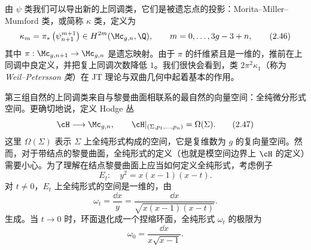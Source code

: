 

由 $\psi$ 类我们可以导出新的上同调类，它们是被遗忘点的投影：Morita–Miller–Mumford 类，或简称 $\kappa$ 类，定义为
\begin{equation}
  \kappa_m=\pi_*\left(\psi_{n+1}^{m+1}\right)\in H^{2m}(\Mc_{g,n},\Q),\qquad m=0,\dots,3g-3+n,
  \tag{2.46}
\end{equation}
其中 $\pi:\Mc_{g,n+1}\to\Mc_{g,n}$ 是遗忘映射。由于 $\pi$ 的纤维紧且是一维的，推前在上同调中良定义，并把复上同调次数降低 $1$。我们很快会看到，类 $2\pi^2\kappa_1$（称为\emph{Weil–Petersson 类}）在 JT 理论与双曲几何中起着基本的作用。

第三组自然的上同调类来自与黎曼曲面相联系的最自然的向量空间：全纯微分形式空间。更确切地说，定义 Hodge 丛
\begin{equation}
  \cH\longrightarrow\Mc_{g,n},\qquad \cH|_{(\Sigma,p_1,\dots,p_n)}=\Omega(\Sigma).
  \tag{2.47}
\end{equation}
这里 $\Omega(\Sigma)$ 表示 $\Sigma$ 上全纯形式构成的空间，它是复维数为 $g$ 的复向量空间。然而，对于带结点的黎曼曲面，全纯形式的定义（也就是模空间边界上 $\cH$ 的定义）需要小心。为了理解在结点黎曼曲面上应当如何定义全纯形式，考虑例子
\begin{equation}
  E_t:\quad y^2=x(x-1)(x-t).
  \tag{2.48}
\end{equation}
对 $t\ne 0$，$E_t$ 上全纯形式的空间是一维的，由
\begin{equation}
  \omega_t=\frac{\dd x}{y}=\frac{\dd x}{\sqrt{x(x-1)(x-t)}}.
  \tag{2.49}
\end{equation}
生成。当 $t\to 0$ 时，环面退化成一个捏缩环面，全纯形式 $\omega_t$ 的极限为
\begin{equation}
  \omega_0=\frac{\dd x}{x\sqrt{x-1}}.
  \tag{2.50}
\end{equation}

